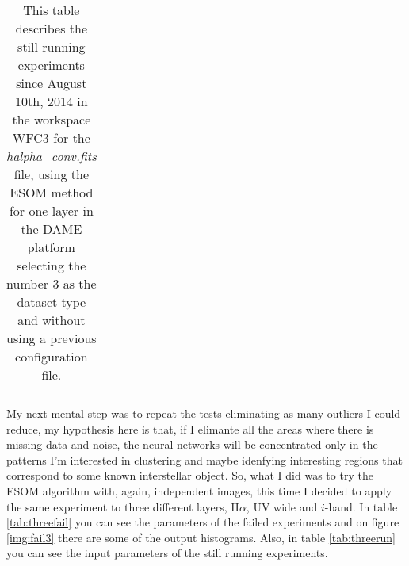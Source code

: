 \documentclass[11pt,fleqn]{book} %
\begin{document}
\begin{table}[h!]
\begin{tabular}{ c c c c c c }
																																																																																																																																																																																																																																																										          \hline
																																																																																																																																																																																																																																																											    \end{tabular}
																																																																																																																																																																																																																																																											      \caption{This table describes the still running experiments since August 10th, 2014 in the workspace WFC3 for the \emph{halpha\_conv.fits} file, using the ESOM method for one layer in the DAME platform selecting the number 3 as the dataset type and without using a previous configuration file.}
																																																																																																																																																																																																																																																											        \label{tab:harun}
																																																																																																																																																																																																																																																												\end{table}

																																																																																																																																																																																																																																																												My next mental step was to repeat the tests eliminating as many outliers I could reduce, my hypothesis here is that, if I elimante all the areas where there is missing data and noise, the neural networks will be concentrated only in the patterns I'm interested in clustering and maybe idenfying interesting regions that correspond to some known interstellar object. So, what I did was to try the ESOM algorithm with, again, independent images, this time I decided to apply the same experiment to three different layers, H$\alpha$, UV wide and $i$-band. In table \ref{tab:threefail} you can see the parameters of the failed experiments and on figure \ref{img:fail3} there are some of the output histograms. Also, in table \ref{tab:threerun} you can see the input parameters of the still running experiments.
\end{document}
